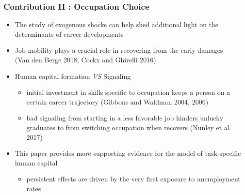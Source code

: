 \documentclass[10pt,svgnames,fragile]{beamer}
\begin{document}
\begin{frame}
	\frametitle{Contribution II : Occupation Choice} 
	\begin{itemize}
		\item The study of exogenous shocks can help shed additional light on the determinants of career developments
\vfill
		\item Job mobility plays a crucial role in recovering from the early damages\\  (Van den Berge 2018, Cockx and Ghirelli 2016) 
\vfill
		\item Human capital formation \textit{VS} Signaling 
		\begin{itemize}
			\vspace{1.5 mm}
			\item initial investment in skills specific to occupation keeps a person on a certain career trajectory (Gibbons and Waldman 2004, 2006)
			\vspace{1 mm}
			\item bad signaling from starting in a less favorable job hinders unlucky graduates to from switching occupation when recovers (Nunley et al. 2017)
		\end{itemize}
\vfill
		\item This paper provides more supporting evidence for the model of task-specific human capital 
		\begin{itemize}
			\vspace{1.5 mm}
			\item  persistent effects are driven by the very first exposure to unemployment rates
		\end{itemize}		
\vfill
	\end{itemize}
\end{frame}
\end{document}
